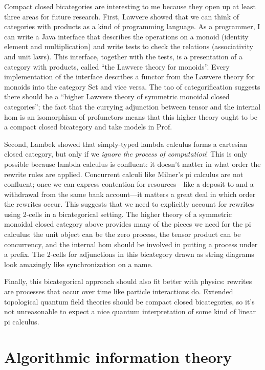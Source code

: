 \documentclass[12pt,twoside,openright]{report}
\begin{document}
Compact closed bicategories are interesting to me because they open up at least three areas for future research.  First, Lawvere showed that we can think of categories with products as a kind of programming language.  As a programmer, I can write a Java interface that describes the operations on a monoid (identity element and multiplication) and write tests to check the relations (associativity and unit laws).  This interface, together with the tests, is a presentation of a category with products, called ``the Lawvere theory for monoids''.  Every implementation of the interface describes a functor from the Lawvere theory for monoids into the category Set and vice versa.  The tao of categorification suggests there should be a ``higher Lawvere theory of symmetric monoidal closed categories''; the fact that the currying adjunction between tensor and the internal hom is an isomorphism of profunctors means that this higher theory ought to be a compact closed bicategory and take models in Prof.

Second, Lambek showed that simply-typed lambda calculus forms a cartesian closed category, but only if we {\em ignore the process of computation}!  This is only possible because lambda calculus is confluent: it doesn't matter in what order the rewrite rules are applied.  Concurrent calculi like Milner's pi calculus are not confluent; once we can express contention for resources---like a deposit to and a withdrawal from the same bank account---it matters a great deal in which order the rewrites occur.  This suggests that we need to explicitly account for rewrites using 2-cells in a bicategorical setting.  The higher theory of a symmetric monoidal closed category above provides many of the pieces we need for the pi calculus: the unit object can be the zero process, the tensor product can be concurrency, and the internal hom should be involved in putting a process under a prefix.  The 2-cells for adjunctions in this bicategory drawn as string diagrams look amazingly like synchronization on a name.

Finally, this bicategorical approach should also fit better with physics: rewrites are processes that occur over time like particle interactions do.  Extended topological quantum field theories should be compact closed bicategories, so it's not unreasonable to expect a nice quantum interpretation of some kind of linear pi calculus.

\part{Algorithmic information theory}
\end{document}
